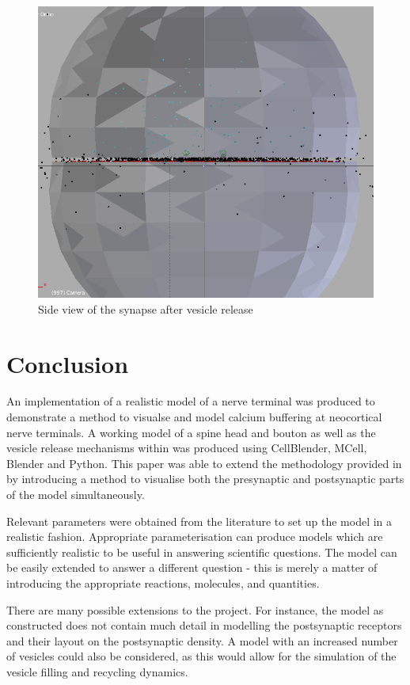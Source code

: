 \documentclass[a4paper]{article}
\begin{document}
\begin{figure}[H]
   \centering
   \includegraphics[scale = 0.4]{side_view.png} %
   \caption{Side view of the synapse after vesicle release}
   \label{fig3}
\end{figure}

\section{Conclusion}
An implementation of a realistic model of a nerve terminal was produced to demonstrate a method to visualse and model calcium buffering at neocortical nerve terminals. A working model of a spine head and bouton as well as the vesicle release mechanisms within was produced using CellBlender, MCell, Blender and Python. This paper was able to extend the methodology provided in \cite{Czech:MethodsMolBiol:2009} by introducing a method to visualise both the presynaptic and postsynaptic parts of the model simultaneously.

Relevant parameters were obtained from the literature to set up the model in a realistic fashion. Appropriate parameterisation can produce models which are sufficiently realistic to be useful in answering scientific questions. The model can be easily extended to answer a different question - this is merely a matter of introducing the appropriate reactions, molecules, and quantities.

There are many possible extensions to the project. For instance, the model as constructed does not contain much detail in modelling the postsynaptic receptors and their layout on the postsynaptic density. A model with an increased number of vesicles could also be considered, as this would allow for the simulation of the vesicle filling and recycling dynamics.
\end{document}
